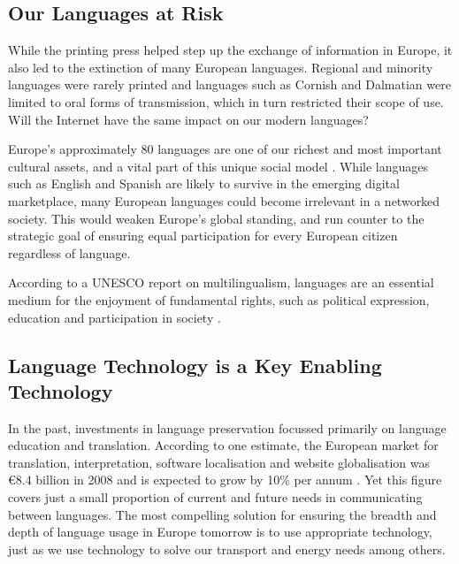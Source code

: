 \begin{multicols}{2}
\subsection{Our Languages at Risk}

While the printing press helped step up the exchange of information in Europe, it also led to the extinction of many European languages. Regional and minority languages were rarely printed and languages such as Cornish and Dalmatian were limited to oral forms of transmission, which in turn restricted their scope of use. Will the Internet have the same impact on our modern languages?\vspace*{0.1cm}

Europe’s approximately 80 languages are one of our richest and most important cultural assets, and a vital part of this unique social mo\-del \cite{EC2}. While languages such as English and Spanish are likely to survive in the emerging digital marketplace, many European languages could become irrelevant in a networked society. This would weaken Europe’s global standing, and run counter to the strategic goal of ensuring equal participation for every European citizen regardless of language.\vspace*{0.1cm}

According to a UNESCO report on multilingualism, languages are an essential medium for the enjoyment of fundamental rights, such as political expression, education and participation in society \cite{Unesco1}.


\subsection{Language Technology is a Key Enabling Technology}

In the past, investments in language preservation focussed primarily on language education and translation. According to one estimate, the European market for translation, interpretation, software localisation and website globalisation was €8.4 billion in 2008 and is expected to grow by 10\% per annum \cite{EC3}. Yet this figure covers just a small proportion of current and future needs in communicating between languages. The most compelling solution for ensuring the breadth and depth of language usage in Europe tomorrow is to use appropriate technology, just as we use technology to solve our transport and energy needs among others.


\end{multicols}
